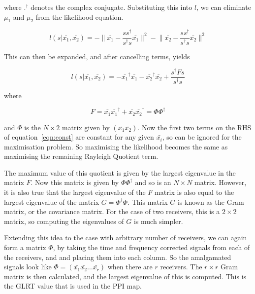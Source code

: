 \documentclass[12pt,openany,a4paper]{book}
\begin{document}
\bigskip

where $.^\dagger$ denotes the complex conjugate. Substituting this into $l$, we can eliminate $\mu_1$ and $\mu_2$ from the likelihood equation.

\begin{equation}
l(s | \bar{x_1}, \bar{x_2}) = - \bigg\| \bar{x_1}-\frac{ss^\dagger }{s^\dagger s} \bar{x_1} \bigg\|^2
- \bigg\| \bar{x_2}-\frac{ss^\dagger }{s^\dagger s} \bar{x_2} \bigg\|^2
\end{equation}

\bigskip

This can then be expanded, and after cancelling terms, yields

\begin{equation}
\label{eqn:const}
l(s | \bar{x_1}, \bar{x_2}) = - \bar{x_1}^\dagger \bar{x_1} - \bar{x_2}^\dagger \bar{x_2}
+ \frac{s^\dagger F s}{s^\dagger s}
\end{equation}

\bigskip

where

\begin{equation}
F = \bar{x_1}\bar{x_1}^\dagger + \bar{x_2}\bar{x_2}^\dagger = \Phi \Phi^\dagger
\end{equation}

\bigskip

and $\Phi$ is the $N\times2$ matrix given by $(\bar{x_1} \bar{x_2})$. Now the first two terms on the RHS of equation~\ref{eqn:const} are constant for any given $\bar{x_i}$, so can be ignored for the maximisation problem. So maximising the likelihood becomes the same as maximising the remaining Rayleigh Quotient term.

\medskip

The maximum value of this quotient is given by the largest eigenvalue in the matrix $F$. Now this matrix is given by $\Phi \Phi^\dagger$ and so is an $N\times N$ matrix. However, it is also true that the largest eigenvalue of the $F$ matrix is also equal to the largest eigenvalue of the matrix $G = \Phi^{\dagger} \Phi$. This matrix $G$ is known as the Gram matrix, or the covariance matrix. For the case of two receivers, this is a $2\times2$ matrix, so computing the eigenvalues of $G$ is much simpler.

\bigskip

Extending this idea to the case with arbitrary number of receivers, we can again form a matrix $\Phi$, by taking the time and frequency corrected signals from each of the receivers, and and placing them into each column. So the amalgamated signals look like $\Phi = (\bar{x_1} \bar{x_2} \ldots \bar{x_r} )$ when there are $r$ receivers. The $r\times r$ Gram matrix is then calculated, and the largest eigenvalue of this is computed. This is the GLRT value that is used in the PPI map.
\end{document}
